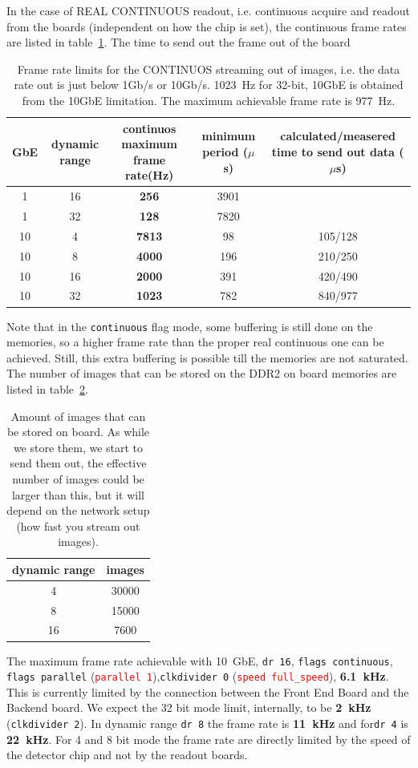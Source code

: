 \documentclass{article}
\begin{document}
{{{In the case of REAL CONTINUOUS readout, i.e. continuous acquire and readout from the boards (independent on how the chip is set), the continuous frame rates are listed in table~\ref{tcont}. The time to send out the frame out of the board 
\begin{table} 
\begin{tabular}{|c|c|c|c|c|}
\hline
\tiny{GbE} & \tiny{dynamic range} & \tiny{continuos maximum frame rate(Hz)} & \tiny{minimum period ($\mu$s)}& \tiny{calculated/measered time to send out data ($\mu$s)}\\
\hline
1 & 16 &  \textbf{256} & 3901 & \\ 
\hline 
1 &  32 &  \textbf{128} & 7820 & \\
\hline 
10 & 4 & \textbf{7813} & 98 & 105/128\\
\hline 
10 & 8 & \textbf{4000} & 196 & 210/250\\
\hline
10 & 16 & \textbf{2000} & 391 & 420/490\\  
\hline 
10 & 32 & \textbf{1023} & 782 & 840/977\\  
\hline 
\end{tabular}
\caption{Frame rate limits for the CONTINUOS streaming out of images, i.e. the data rate out is just below 1Gb/s or 10Gb/s. 1023~Hz for 32-bit, 10GbE is obtained from the 10GbE limitation. The maximum achievable frame rate is 977~Hz.} 
\label{tcont}\end{table}
 Note that in the {\tt{continuous}} flag mode, some buffering is still done on the memories, so a higher frame rate than the proper real continuous one can be achieved. Still, this extra buffering is possible till the memories are not saturated. The number of images that can be stored on the DDR2 on board memories are listed in table~\ref{timgs}.
\begin{table}
\begin{tabular}{|c|c|}
\hline
dynamic range & images\\
\hline
4 & 30000\\
\hline
8 & 15000\\
\hline
16 & 7600\\
\hline
\end{tabular}
\caption{Amount of images that can be stored on board. As while we store them, we start to send them out, the effective number of images could be larger than this, but it will depend on the network setup (how fast you stream out images).}
\label{timgs}
\end{table}

The maximum frame rate achievable with 10~GbE, {\tt{dr 16}}, {\tt{flags continuous}}, {\tt{flags parallel}} ({\tt{\textcolor{red}{parallel 1}}}),{\tt{clkdivider 0}} ({\tt{\textcolor{red}{speed full\_speed}}}), \textbf{6.1~kHz}. This is currently limited by the connection between the Front End Board and the Backend board. We expect the 32 bit mode limit, internally, to be \textbf{2~kHz} ({\tt{clkdivider 2}}).
 In dynamic range {\tt{dr 8}} the frame rate is \textbf{11~kHz} and for{\tt{dr 4}} is \textbf{22~kHz}. For 4 and 8 bit mode the frame rate are directly limited by the speed of the detector chip and not by the readout boards.    

}}}
\end{document}
